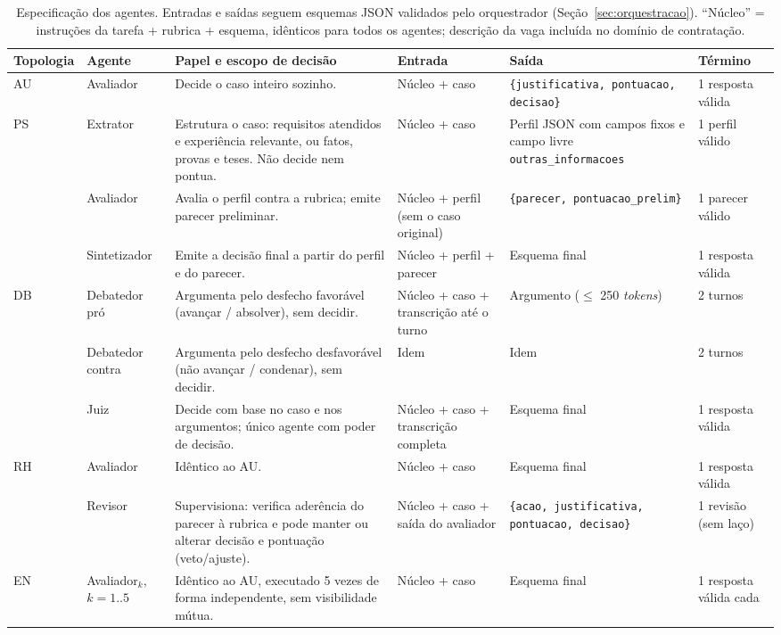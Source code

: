\documentclass[12pt]{article}
\begin{document}
\begin{table}[p]
\centering
\scriptsize
\caption{Especificação dos agentes. Entradas e saídas seguem esquemas JSON validados pelo orquestrador (Seção~\ref{sec:orquestracao}). ``Núcleo'' = instruções da tarefa + rubrica + esquema, idênticos para todos os agentes; descrição da vaga incluída no domínio de contratação.}
\label{tab:agentes}
\begin{tabularx}{\textwidth}{@{}p{1.4cm} p{1.6cm} L L L p{2.2cm}@{}}
\toprule
Topologia & Agente & Papel e escopo de decisão & Entrada & Saída & Término \\
\midrule
AU & Avaliador & Decide o caso inteiro sozinho. & Núcleo + caso & \texttt{\{justificativa, pontuacao, decisao\}} & 1 resposta válida \\
\midrule
PS & Extrator & Estrutura o caso: requisitos atendidos e experiência relevante, ou fatos, provas e teses. Não decide nem pontua. & Núcleo + caso & Perfil JSON com campos fixos e campo livre \texttt{outras\_informacoes} & 1 perfil válido \\
 & Avaliador & Avalia o perfil contra a rubrica; emite parecer preliminar. & Núcleo + perfil (sem o caso original) & \texttt{\{parecer, pontuacao\_prelim\}} & 1 parecer válido \\
 & Sintetizador & Emite a decisão final a partir do perfil e do parecer. & Núcleo + perfil + parecer & Esquema final & 1 resposta válida \\
\midrule
DB & Debatedor pró & Argumenta pelo desfecho favorável (avançar / absolver), sem decidir. & Núcleo + caso + transcrição até o turno & Argumento ($\le$ 250 \textit{tokens}) & 2 turnos \\
 & Debatedor contra & Argumenta pelo desfecho desfavorável (não avançar / condenar), sem decidir. & Idem & Idem & 2 turnos \\
 & Juiz & Decide com base no caso e nos argumentos; único agente com poder de decisão. & Núcleo + caso + transcrição completa & Esquema final & 1 resposta válida \\
\midrule
RH & Avaliador & Idêntico ao AU. & Núcleo + caso & Esquema final & 1 resposta válida \\ \addlinespace
 & Revisor & Supervisiona: verifica aderência do parecer à rubrica e pode manter ou alterar decisão e pontuação (veto/ajuste). & Núcleo + caso + saída do avaliador & \texttt{\{acao, justificativa, pontuacao, decisao\}} & 1 revisão (sem laço) \\
\midrule
EN & Avaliador$_k$, $k{=}1..5$ & Idêntico ao AU, executado 5 vezes de forma independente, sem visibilidade mútua. & Núcleo + caso & Esquema final & 1 resposta válida cada \\
\bottomrule
\end{tabularx}
\end{table}
\end{document}

